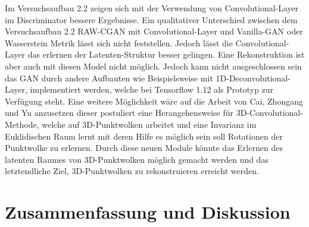 \documentclass{llncs}
\begin{document}
Im Versuchsaufbau 2.2 zeigen sich mit der Verwendung von Convolutional-Layer im Discriminator bessere Ergebnisse. Ein qualitativer Unterschied zwischen dem Versuchsaufbau 2.2 RAW-CGAN mit Convolutional-Layer und Vanilla-GAN oder Wasserstein Metrik lässt sich nicht feststellen. Jedoch lässt die Convolutional-Layer das erlernen der Latenten-Struktur besser gelingen. Eine Rekonstruktion ist aber auch mit diesen Model nicht möglich. Jedoch kann nicht ausgeschlossen sein das GAN durch andere Aufbauten wie Beispielsweise mit 1D-Deconvolutional-Layer, implementiert werden, welche bei Tensorflow 1.12 als Prototyp zur Verfügung steht. Eine weitere Möglichkeit wäre auf die Arbeit von Cai, Zhongang  und Yu \cite{3d-conv} anzusetzen dieser postuliert eine Herangehensweise für 3D-Convolutional- Methode, welche auf 3D-Punktwolken arbeitet und eine Invarianz im Euklidischen Raum lernt mit deren Hilfe es möglich sein soll Rotationen der Punktwolke zu erlernen. Durch diese neuen Module könnte das Erlernen des latenten Raumes von 3D-Punktwolken möglich gemacht werden und das letztendliche Ziel, 3D-Punktwolken zu rekonstruieren erreicht werden. 
\newpage
\section{Zusammenfassung und Diskussion }
\end{document}
